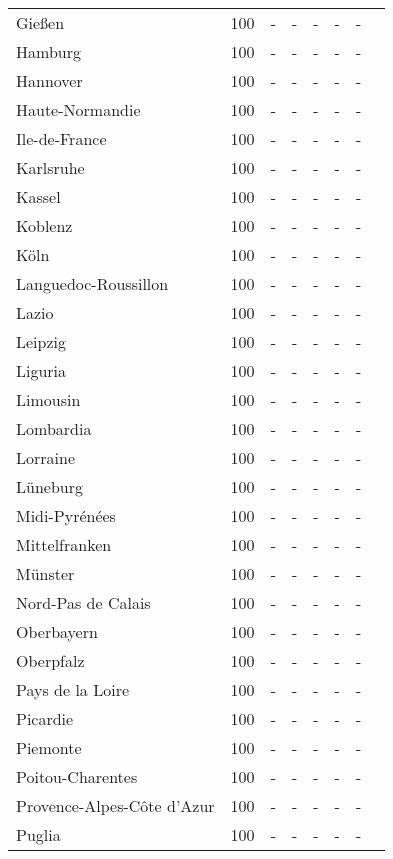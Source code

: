 \begin{table}[H]
\begin{tabularx}{\textwidth}{Xccccccc}
            Gießen & 100 & - & - & - & - & - \\
            Hamburg & 100 & - & - & - & - & - \\
            Hannover & 100 & - & - & - & - & - \\
            Haute-Normandie  & 100 & - & - & - & - & - \\
            Ile-de-France & 100 & - & - & - & - & - \\
            Karlsruhe & 100 & - & - & - & - & - \\
            Kassel & 100 & - & - & - & - & - \\
            Koblenz & 100 & - & - & - & - & - \\
            Köln & 100 & - & - & - & - & - \\
            Languedoc-Roussillon & 100 & - & - & - & - & - \\
            Lazio & 100 & - & - & - & - & - \\
            Leipzig & 100 & - & - & - & - & - \\
            Liguria & 100 & - & - & - & - & - \\
            Limousin & 100 & - & - & - & - & - \\
            Lombardia & 100 & - & - & - & - & - \\
            Lorraine & 100 & - & - & - & - & - \\
            Lüneburg & 100 & - & - & - & - & - \\
            Midi-Pyrénées & 100 & - & - & - & - & - \\
            Mittelfranken & 100 & - & - & - & - & - \\
            Münster & 100 & - & - & - & - & - \\
            Nord-Pas de Calais & 100 & - & - & - & - & - \\
            Oberbayern & 100 & - & - & - & - & - \\
            Oberpfalz & 100 & - & - & - & - & - \\
            Pays de la Loire & 100 & - & - & - & - & - \\
            Picardie & 100 & - & - & - & - & - \\
            Piemonte & 100 & - & - & - & - & - \\
            Poitou-Charentes & 100 & - & - & - & - & - \\
            Provence-Alpes-Côte d’Azur & 100 & - & - & - & - & - \\
            Puglia & 100 & - & - & - & - & - \\

\end{tabularx}
\end{table}
